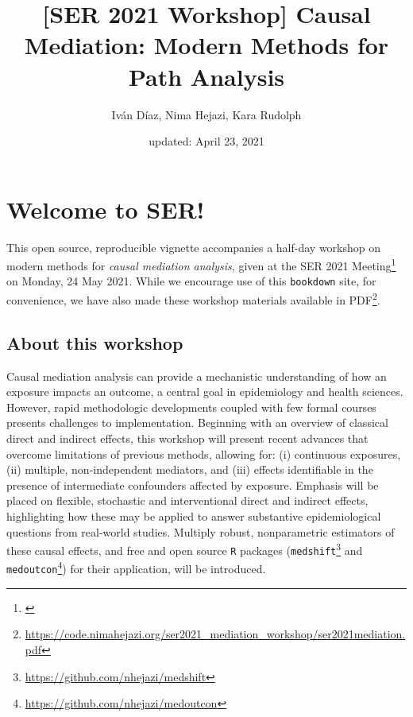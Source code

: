 \documentclass[
  12pt, krantz2,
]{book}
\title{{[}SER 2021 Workshop{]} Causal Mediation: Modern Methods for Path Analysis}
\author{Iván Díaz, Nima Hejazi, Kara Rudolph}
\date{updated: April 23, 2021}
\renewcommand{\href}[2]{#2\footnote{\url{#1}}}
\theoremstyle{definition}
\theoremstyle{definition}
\theoremstyle{definition}
\newcommand{\1}{\mathbbm{1}}
\begin{document}
\maketitle


\thispagestyle{empty}

\begin{center}

\end{center}

\setlength{\abovedisplayskip}{-5pt}
\setlength{\abovedisplayshortskip}{-5pt}

{
\hypersetup{linkcolor=}
\setcounter{tocdepth}{1}
\tableofcontents
}
\listoftables
\listoffigures
\hypertarget{welcome-to-ser}{%
\chapter*{Welcome to SER!}\label{welcome-to-ser}}


This open source, reproducible vignette accompanies a half-day workshop on
modern methods for \emph{causal mediation analysis}, given at the \href{}{SER 2021
Meeting} on Monday, 24 May 2021. While we encourage use of this \texttt{bookdown}
site, for convenience, we have also made these workshop materials \href{https://code.nimahejazi.org/ser2021_mediation_workshop/ser2021mediation.pdf}{available in
PDF}.

\hypertarget{about}{%
\section{About this workshop}\label{about}}

Causal mediation analysis can provide a mechanistic understanding of how an
exposure impacts an outcome, a central goal in epidemiology and health sciences.
However, rapid methodologic developments coupled with few formal courses
presents challenges to implementation. Beginning with an overview of classical
direct and indirect effects, this workshop will present recent advances that
overcome limitations of previous methods, allowing for: (i) continuous
exposures, (ii) multiple, non-independent mediators, and (iii) effects
identifiable in the presence of intermediate confounders affected by exposure.
Emphasis will be placed on flexible, stochastic and interventional direct and
indirect effects, highlighting how these may be applied to answer substantive
epidemiological questions from real-world studies. Multiply robust,
nonparametric estimators of these causal effects, and free and open source \texttt{R}
packages (\href{https://github.com/nhejazi/medshift}{\texttt{medshift}} and
\href{https://github.com/nhejazi/medoutcon}{\texttt{medoutcon}}) for their application, will
be introduced.
\end{document}
